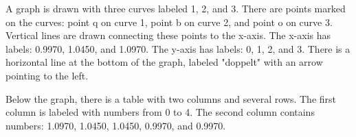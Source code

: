 A graph is drawn with three curves labeled 1, 2, and 3. There are points marked on the curves: point q on curve 1, point b on curve 2, and point o on curve 3. Vertical lines are drawn connecting these points to the x-axis. The x-axis has labels: 0.9970, 1.0450, and 1.0970. The y-axis has labels: 0, 1, 2, and 3. There is a horizontal line at the bottom of the graph, labeled "doppelt" with an arrow pointing to the left.

Below the graph, there is a table with two columns and several rows. The first column is labeled with numbers from 0 to 4. The second column contains numbers: 1.0970, 1.0450, 1.0450, 0.9970, and 0.9970.